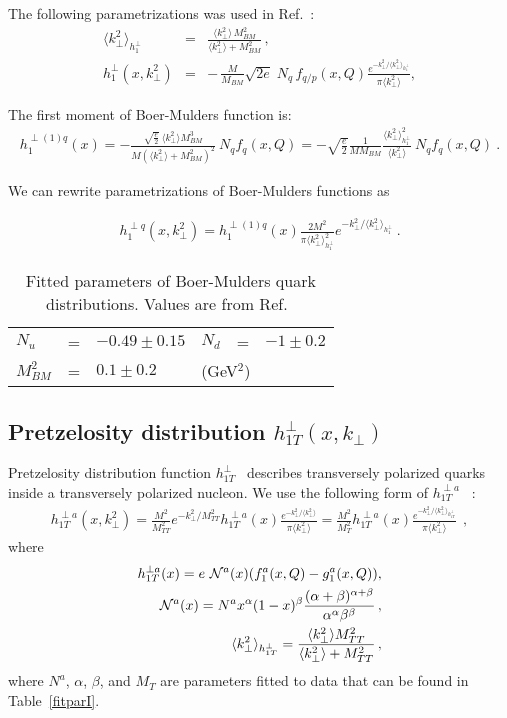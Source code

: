 \documentclass[a4paper,11pt]{article}
\newcommand{\ba}{\begin{eqnarray}}
\newcommand{\ea}{\end{eqnarray}}
\newcommand{\la}{\langle}
\newcommand{\ra}{\rangle}
\def\kperp{k_\perp}
\def\avkperp{\la \kperp^2 \ra}
\begin{document}
The following parametrizations was used in Ref.~\cite{Barone:2015ksa}:
\ba
\avkperp_{h_1^\perp} &=& \frac{\avkperp \, M^2_{BM}}{\avkperp + M^2_{BM}} \, , \\
h_{1}^{\perp}(x, \kperp^2) &= &
- \,\frac{M}{M_{BM}}  
\sqrt{2e}\; N_q 
\, f_{q/p} (x, Q)\frac{e^{-\kperp^2/\avkperp_{h_{1}^{\perp}}}}{\pi\avkperp},  
\label{BM-dist}
\ea
 
The first moment of Boer-Mulders function is:
\ba
h_{1}^{\perp (1) q}(x)  = -\frac{\sqrt{\frac{e}{2}} \ \avkperp M_{BM}^3}{M (\avkperp + M_{BM}^2)^2}  \ {N}_q f_q(x, Q) = -\sqrt{\frac{e}{2}} \frac{1}{M M_{BM}}  \frac{\avkperp_{h_1^\perp}^2}{\avkperp}    \ {N}_q  f_q(x, Q)
\label{bm} \ .
\ea
 
We can rewrite parametrizations of Boer-Mulders functions as

\ba
h_{1}^{\perp q}(x,\kperp^2) =  h_{1}^{\perp (1) q}(x)   \frac{2 M^2}{\pi \avkperp_{h_{1}^\perp}^2} e^{-\kperp^2/{\avkperp_{h_{1}^\perp}}}\label{bm_new} \ .
\ea
 
 
%
\begin{table}[htb]
\centering
\begin{tabular}{l c l l c l}
\hline
 $N_{u}$ &=& $-0.49 \pm 0.15$ & $N_{d}$ &=& $-1 \pm 0.2$\\
 $M_{BM}^2$ &=& $0.1 \pm  0.2$&\multicolumn{3}{l}{(GeV$^2$)}\\ 
\hline
\end{tabular}
\caption{Fitted parameters of Boer-Mulders quark distributions. Values are from Ref.~\cite{Barone:2015ksa}}
\label{fitparbm}
\end{table}
 
\subsection{\boldmath Pretzelosity distribution $h_{1T}^{\perp}(x,k_\perp)$}
\label{App:basis-h1Tperp}

Pretzelosity   distribution function   
$h_{1T}^{\perp}$~\cite{Lefky:2014eia} describes transversely polarized quarks 
inside a transversely polarized nucleon.
We use the following form of $h_{1T}^{\perp a}$ ~\cite{Lefky:2014eia}:
\ba
h_{1T}^{\perp a}(x,k_{\perp}^2) = \frac{M^2}{M_{TT}^2} e^{-\kperp^2/M_{TT}^2} h^{\perp a}_{1T}(x) \frac{e^{-{\kperp^2}/{\avkperp}}}{\pi \avkperp}=\frac{M^2}{M_T^2} h^{\perp a}_{1T}(x) \frac{e^{-{\kperp^2}/{\avkperp_{h_{1T}^\perp}}}}{\pi \avkperp}\,\;,
\label{eq:h1Tperp}
\ea
where
\ba
h^{\perp a}_{1T}(x) = e  \ {\cal N}^a(x) (f_{1}^{a}(x, Q) - g_{1}^{a}(x, Q)), \label{eq:hx_par}\\
{\cal N}^a(x) = N^{a} x^{\alpha} (1-x)^{\beta} \frac{(\alpha + \beta)^{\alpha + \beta}}{\alpha^{\alpha} \beta^{\beta}}\, ,  \\
\avkperp_{h_{1T}^\perp}  = \frac{\avkperp M_{TT}^2}{\avkperp + M_{TT}^2}\, ,
\ea
where ${N}^a$, $\alpha$, $\beta$, and $M_T$ are parameters fitted to data that can be found in Table~\ref{fitparI}.
\end{document}
